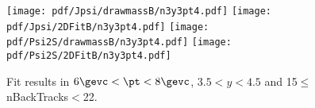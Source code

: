 \begin{figure}[H]
\begin{center}
\texttt{[image: pdf/Jpsi/drawmassB/n3y3pt4.pdf]}
\texttt{[image: pdf/Jpsi/2DFitB/n3y3pt4.pdf]}
\vspace*{-0.5cm}
\texttt{[image: pdf/Psi2S/drawmassB/n3y3pt4.pdf]}
\texttt{[image: pdf/Psi2S/2DFitB/n3y3pt4.pdf]}
\vspace*{-0.5cm}
\end{center}
\caption{Fit results in $6\gevc<\pt<8\gevc$, $3.5<y<4.5$ and 15$\leq$nBackTracks$<$22.}
\label{Fitn3y3pt4}
\end{figure}
